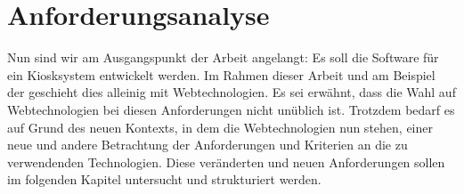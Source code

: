\chapter{Anforderungsanalyse}
\label{section:anforderungen}

Nun sind wir am Ausgangspunkt der Arbeit angelangt: Es soll die Software für ein Kiosksystem
entwickelt werden. Im Rahmen dieser Arbeit und am Beispiel der \shst{}
geschieht dies alleinig mit Webtechnologien. Es sei erwähnt, dass die Wahl
auf Webtechnologien bei diesen Anforderungen nicht unüblich ist.
Trotzdem bedarf es auf Grund des neuen Kontexts, in dem die Webtechnologien nun stehen,
einer neue und andere Betrachtung der Anforderungen und Kriterien an die 
zu verwendenden Technologien. Diese veränderten und neuen Anforderungen sollen 
im folgenden Kapitel untersucht und strukturiert werden.\\

\iffalse
- Untersuchung der Anforderungen an die Software. Dabei stellen manche Anforderungen auch 
  Ansprüche an andere Teile des Systems. Die Überschneidung lässt sich nicht vermeiden.
- Funktionale Anforderungen stellen Forderungen an das Gesamtsystem
- Die nicht-funktionalen Anforderungen sind auf die Anforderungen an die Software beschränkt
\fi


